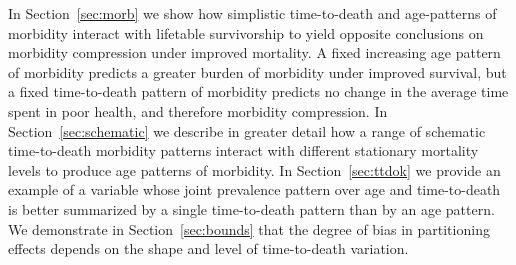 \documentclass[11pt,oneside,a4paper]{article} %
\begin{document}
In Section~\ref{sec:morb} we show how simplistic time-to-death and age-patterns of morbidity interact with lifetable survivorship to yield opposite conclusions on morbidity compression under improved mortality. A fixed increasing age pattern of morbidity predicts a greater burden of morbidity under improved survival, but a fixed time-to-death pattern of morbidity predicts no change in the average time spent in poor health, and therefore morbidity compression. In Section~\ref{sec:schematic} we describe in greater detail how a range of schematic time-to-death morbidity patterns interact with different stationary mortality levels to produce age patterns of morbidity. In Section~\ref{sec:ttdok} we provide an example of a variable whose joint prevalence pattern over age and time-to-death is better summarized by a single time-to-death pattern than by an age pattern. We demonstrate in Section~\ref{sec:bounds} that the degree of bias in partitioning effects depends on the shape and level of time-to-death variation. 



\newpage%


\end{document}
